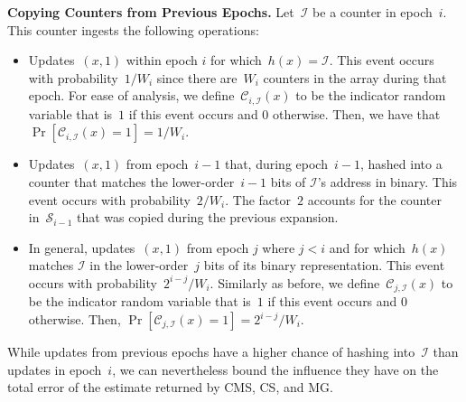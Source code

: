 \documentclass[sigconf]{acmart}
\begin{document}
\medskip
\textbf{Copying Counters from Previous Epochs.}
Let~$\mathcal{I}$ be a counter in epoch~$i$. This counter ingests the following
operations:

\begin{itemize}
    \item Updates~$(x,1)$ within epoch $i$ for which~$h(x)=\mathcal{I}$. This
        event occurs with probability~$1/W_i$ since there are~$W_i$ counters in
        the array during that epoch. For ease of analysis, we
        define~$\mathcal{C}_{i,\mathcal{I}}(x)$ to be the indicator random
        variable that is~$1$ if this event occurs and $0$ otherwise. Then, we
        have that~$\Pr\left[ \mathcal{C}_{i,\mathcal{I}}(x) = 1 \right] = 1/W_i$.

    \item Updates~$(x,1)$ from epoch~$i-1$ that, during epoch~$i-1$, hashed
        into a counter that matches the lower-order~$i - 1$ bits of
        $\mathcal{I}$'s address in binary. This event occurs with
        probability~$2/W_i$. The factor~$2$ accounts for the counter
        in~$\mathcal{S}_{i-1}$ that was copied during the previous expansion.

    \item In general, updates~$(x,1)$ from epoch $j$ where $j < i$ and for
        which~$h(x)$ matches $\mathcal{I}$ in the lower-order~$j$ bits of its
        binary representation. This event occurs with
        probability~$2^{i-j}/W_i$. Similarly as before, we
        define~$\mathcal{C}_{j,\mathcal{I}}(x)$ to be the indicator random
        variable that is~$1$ if this event occurs and $0$ otherwise. Then,
        $\Pr\left[ \mathcal{C}_{j,\mathcal{I}}(x) = 1 \right] =  2^{i-j}/W_i$.
\end{itemize}

While updates from previous epochs have a higher chance of hashing
into~$\mathcal{I}$ than updates in epoch~$i$, we can nevertheless bound the
influence they have on the total error of the estimate returned by CMS, CS, and
MG.
\end{document}
